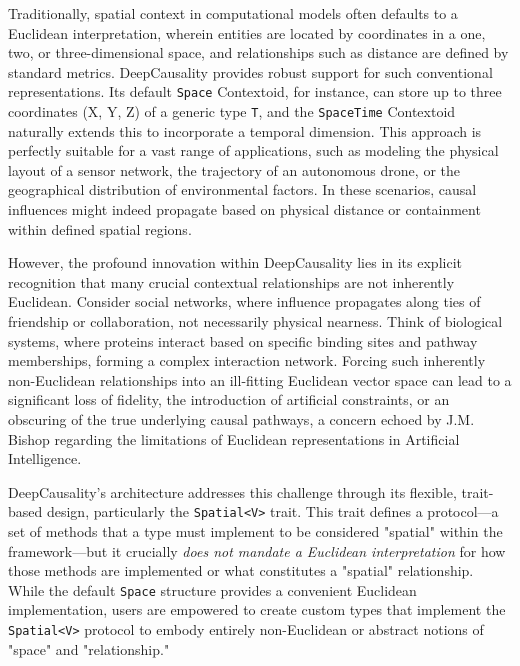Traditionally, spatial context in computational models often defaults to a Euclidean interpretation, wherein entities are located by coordinates in a one, two, or three-dimensional space, and relationships such as distance are defined by standard metrics. DeepCausality provides robust support for such conventional representations. Its default \texttt{Space} Contextoid, for instance, can store up to three coordinates (X, Y, Z) of a generic type \texttt{T}, and the \texttt{SpaceTime} Contextoid naturally extends this to incorporate a temporal dimension. This approach is perfectly suitable for a vast range of applications, such as modeling the physical layout of a sensor network, the trajectory of an autonomous drone, or the geographical distribution of environmental factors. In these scenarios, causal influences might indeed propagate based on physical distance or containment within defined spatial regions.

However, the profound innovation within DeepCausality lies in its explicit recognition that many crucial contextual relationships are not inherently Euclidean. Consider social networks, where influence propagates along ties of friendship or collaboration, not necessarily physical nearness. Think of biological systems, where proteins interact based on specific binding sites and pathway memberships, forming a complex interaction network. Forcing such inherently non-Euclidean relationships into an ill-fitting Euclidean vector space can lead to a significant loss of fidelity, the introduction of artificial constraints, or an obscuring of the true underlying causal pathways, a concern echoed by J.M. Bishop \cite{bishop2020artificialintelligencestupidcausal} regarding the limitations of Euclidean representations in Artificial Intelligence.

DeepCausality's architecture addresses this challenge through its flexible, trait-based design, particularly the \texttt{Spatial<V>} trait. This trait defines a protocol---a set of methods that a type must implement to be considered "spatial" within the framework---but it crucially \textit{does not mandate a Euclidean interpretation} for how those methods are implemented or what constitutes a "spatial" relationship. While the default \texttt{Space} structure provides a convenient Euclidean implementation, users are empowered to create custom types that implement the \texttt{Spatial<V>} protocol to embody entirely non-Euclidean or abstract notions of "space" and "relationship."

